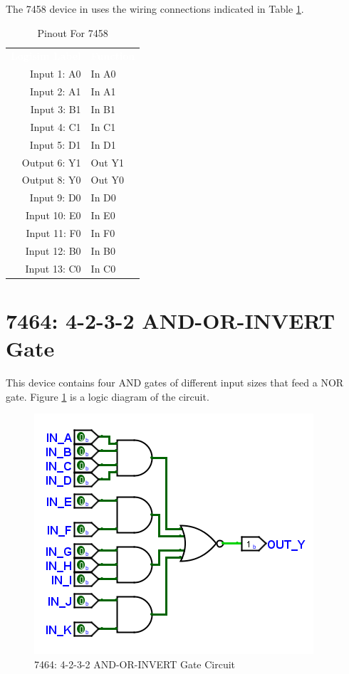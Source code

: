 The 7458 device in \LE uses the wiring connections indicated in Table \ref{tab:50-7458}.

\begin{table}[H]
	\sffamily
	\newcommand{\head}[1]{\textcolor{white}{\textbf{#1}}}		
	\begin{center}
		\begin{tabular}{rl} 
			\rowcolor{black!75}
			\head{Logisim Label} & \head{Function} \\
			Input 1: A0   & In A0  \\
			Input 2: A1   & In A1  \\
			Input 3: B1   & In B1  \\
			Input 4: C1   & In C1  \\
			Input 5: D1   & In D1  \\
			Output 6: Y1  & Out Y1 \\
			Output 8: Y0  & Out Y0 \\
			Input 9: D0   & In D0  \\
			Input 10: E0  & In E0 \\
			Input 11: F0  & In F0 \\
			Input 12: B0  & In B0 \\
			Input 13: C0  & In C0 \\
		\end{tabular}
	\end{center}
	\caption{Pinout For 7458}
	\label{tab:50-7458}
\end{table}

\section{7464: 4-2-3-2 AND-OR-INVERT Gate}

This device contains four AND gates of different input sizes that feed a NOR gate. Figure \ref{fig:50-7464} is a logic diagram of the circuit.

\begin{figure}[H]
	\centering
	\includegraphics{gfx/50-7464}
	\caption{7464: 4-2-3-2 AND-OR-INVERT Gate Circuit}
	\label{fig:50-7464}
\end{figure}

